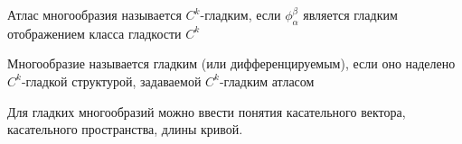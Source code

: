 \begin{definition}
Атлас многообразия называется $C^k$-гладким, если ${\displaystyle \phi _{\alpha }^{\beta }}$ является гладким отображением класса гладкости $C^k$
\end{definition}

\begin{definition}
Многообразие называется гладким (или дифференцируемым), если оно наделено $C^k$-гладкой структурой, задаваемой $C^k$-гладким атласом
\end{definition}

Для гладких многообразий можно ввести понятия касательного вектора, касательного пространства, длины кривой.

